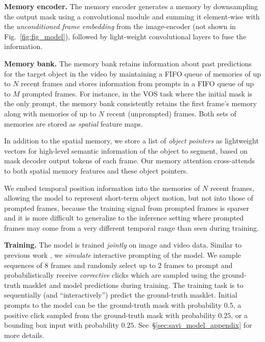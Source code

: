 \documentclass[]{fairmeta}
\renewcommand{\paragraph}[1]{\vspace{1.25mm}\noindent\textbf{#1}}
\newcommand{\figref}[1]{Fig.~\ref{#1}}
\renewcommand{\paragraph}[1]{\vspace{1.25mm}\noindent\textbf{#1}}
\begin{document}
\paragraph{Memory encoder.} The memory encoder generates a memory by downsampling the output mask using a convolutional module and summing it element-wise with the \textit{unconditioned frame embedding} from the image-encoder (not shown in \figref{fig:fig_model}), followed by light-weight convolutional layers to fuse the information.

\paragraph{Memory bank.} The memory bank retains information about past predictions for the target object in the video by maintaining a FIFO queue of memories of up to $N$ recent frames and stores information from prompts in a FIFO queue of up to $M$ prompted frames. For instance, in the VOS task where the initial mask is the only prompt, the memory bank consistently retains the first frame's memory along with memories of up to $N$ recent (unprompted) frames. Both sets of memories are stored as \textit{spatial} feature maps.

In addition to the spatial memory, we store a list of \textit{object pointers} as lightweight vectors for high-level semantic information of the object to segment, based on mask decoder output tokens of each frame. Our memory attention cross-attends to both spatial memory features and these object pointers.

We embed temporal position information into the memories of $N$ recent frames, allowing the model to represent short-term object motion, but not into those of prompted frames, because the training signal from prompted frames is sparser and it is more difficult to generalize to the inference setting where prompted frames may come from a very different temporal range than seen during training.

\paragraph{Training.} The model is trained \textit{jointly} on image and video data. Similar to previous work \citep{kirillov2023segment, ritm}, we \textit{simulate} interactive prompting of the model. We sample sequences of 8 frames and randomly select up to 2 frames to prompt and probabilistically receive \textit{corrective} clicks which are sampled using the ground-truth masklet and model predictions during training. The training task is to sequentially (and ``interactively'') predict the ground-truth masklet. Initial prompts to the model can be the ground-truth mask with probability $0.5$, a positive click sampled from the ground-truth mask with probability $0.25$, or a bounding box input with probability $0.25$. See~\S\ref{sec:savi_model_appendix} for more details.
\end{document}
